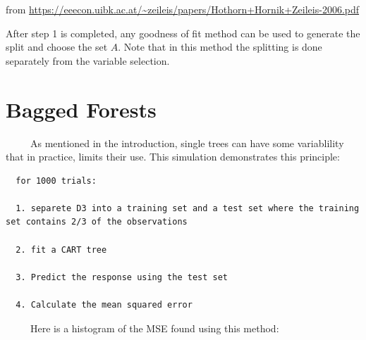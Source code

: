 \documentclass[12pt,twoside]{reedthesis}
\begin{document}
  from
  \url{https://eeecon.uibk.ac.at/~zeileis/papers/Hothorn+Hornik+Zeileis-2006.pdf}
  
  After step 1 is completed, any goodness of fit method can be used to
  generate the split and choose the set \(A\). Note that in this method
  the splitting is done separately from the variable selection.
  
  \section{Bagged Forests}\label{bagged-forests}
  
  ~~~~~As mentioned in the introduction, single trees can have some
  variablility that in practice, limits their use. This simulation
  demonstrates this principle:
  
  \begin{verbatim}
  for 1000 trials:
  
  1. separete D3 into a training set and a test set where the training set contains 2/3 of the observations
  
  2. fit a CART tree
  
  3. Predict the response using the test set 
  
  4. Calculate the mean squared error 
  \end{verbatim}
  
  ~~~~~Here is a histogram of the MSE found using this method:
  
  \begin{Shaded}
  \begin{Highlighting}[]
  \StringTok{ }\NormalTok{(}\NormalTok{,}\NormalTok{)}
  
  \NormalTok{:}\NormalTok{)\{}
    \StringTok{ }\NormalTok{(}\NormalTok{, }\NormalTok{)}
    \StringTok{ }
    \StringTok{ }\StringTok{ }\NormalTok{)}
  \NormalTok{\}}
  
  \StringTok{ }
  
  \end{Highlighting}
  \end{Shaded}
  
\end{document}
